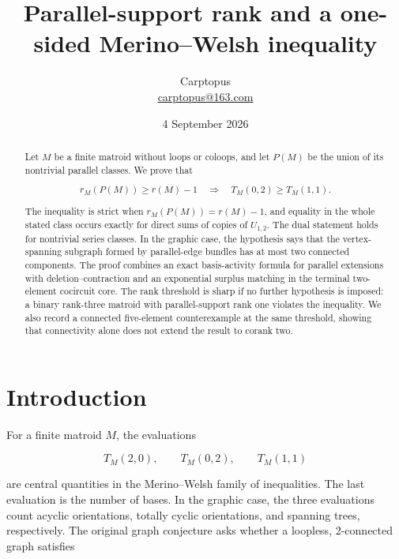 \documentclass[11pt]{article}
\title{Parallel-support rank and a one-sided Merino--Welsh inequality}
\author{Carptopus\\\href{mailto:carptopus@163.com}{carptopus@163.com}}
\date{4 September 2026}
\begin{document}
\maketitle

\begin{center}
\end{center}

\begin{abstract}


Let \(M\) be a finite matroid without loops or coloops, and let \(P(M)\) be
the union of its nontrivial parallel classes. We prove that

\[
r_M(P(M))\ge r(M)-1
\quad\Longrightarrow\quad
T_M(0,2)\ge T_M(1,1).
\]

The inequality is strict when \(r_M(P(M))=r(M)-1\), and equality in the
whole stated class occurs exactly for direct sums of copies of \(U_{1,2}\).
The dual statement holds for nontrivial series classes. In the graphic case,
the hypothesis says that the vertex-spanning subgraph formed by parallel-edge
bundles has at most two connected components. The proof combines an exact
basis-activity formula for parallel extensions with deletion--contraction and
an exponential surplus matching in the terminal two-element cocircuit core.
The rank threshold is sharp if no further hypothesis is imposed: a binary
rank-three matroid with parallel-support rank one violates the inequality.
We also record a connected five-element counterexample at the same threshold,
showing that connectivity alone does not extend the result to corank two.

\end{abstract}

\section{Introduction}


For a finite matroid \(M\), the evaluations

\[
T_M(2,0),\qquad T_M(0,2),\qquad T_M(1,1)
\]

are central quantities in the Merino--Welsh family of inequalities. The last
evaluation is the number of bases. In the graphic case, the three evaluations
count acyclic orientations, totally cyclic orientations, and spanning trees,
respectively. The original graph conjecture asks whether a loopless,
2-connected graph satisfies \cite{merino-welsh}
\end{document}
